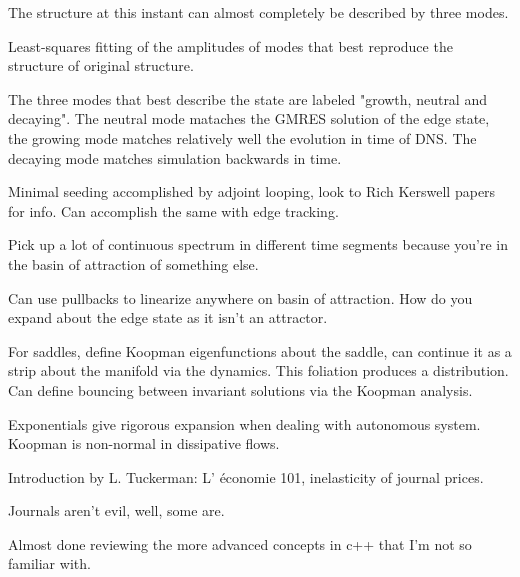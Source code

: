 \begin{description}
{\begin{description}
The structure at this instant can almost completely be described by three modes.

Least-squares fitting of the amplitudes of modes that best reproduce the structure
of original structure.

The three modes that best describe the state are labeled "growth, neutral and decaying".
The neutral mode mataches the GMRES solution of the edge state, the growing mode
matches relatively well the evolution in time of DNS. The decaying mode matches simulation
backwards in time.

Minimal seeding accomplished by adjoint looping, look to Rich Kerswell papers for info.
Can accomplish the same with edge tracking.

Pick up a lot of continuous spectrum in different time segments because you're in the
basin of attraction of something else.

Can use pullbacks to linearize anywhere on basin of attraction. How do you expand
about the edge state as it isn't an attractor.

For saddles, define Koopman eigenfunctions about the saddle, can continue it as a strip
about the manifold via the dynamics. This foliation produces a distribution.
Can define bouncing between invariant solutions via the Koopman analysis.

Exponentials give rigorous expansion when dealing with autonomous system. Koopman
is non-normal in dissipative flows.

\item[M. Farge Talk]
Introduction by L. Tuckerman:
L' \'economie 101, inelasticity of journal prices.

Journals aren't evil, well, some are.

\item[misc]
Almost done reviewing the more advanced concepts in c++
that I'm not so familiar with.

\end{description}
}

\end{description}
